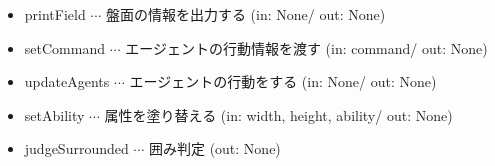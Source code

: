 \documentclass[a4j, 10pt, dvipdfmx, titlepage]{jarticle}
\begin{document}
{\begin{itemize}
\begin{itemize}
                \item printField $\cdots$ 盤面の情報を出力する (in: None/ out: None)
                \item setCommand $\cdots$ エージェントの行動情報を渡す (in: command/ out: None)
                \item updateAgents $\cdots$ エージェントの行動をする (in: None/ out: None)
                \item setAbility $\cdots$ 属性を塗り替える (in: width, height, ability/ out: None)
                \item judgeSurrounded $\cdots$ 囲み判定 (out: None)
            \end{itemize}
        \end{itemize}
}
\end{document}
